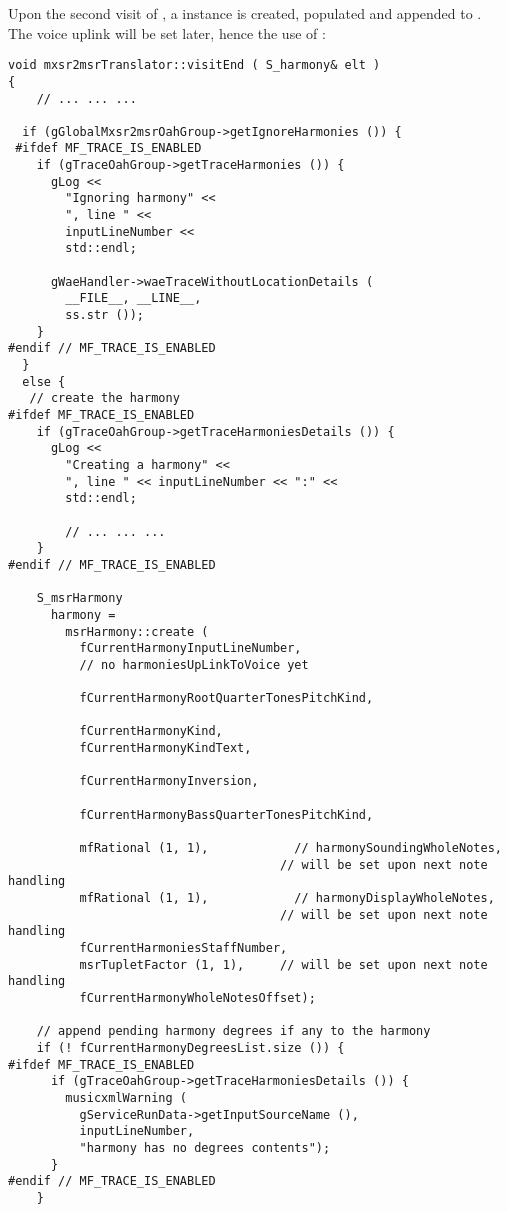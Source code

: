 Upon the second visit of , a  instance is created, populated and appended to .\\
The voice uplink will be set later, hence the use of :
\begin{lstlisting}[language=CPlusPlus]
void mxsr2msrTranslator::visitEnd ( S_harmony& elt )
{
	// ... ... ...

  if (gGlobalMxsr2msrOahGroup->getIgnoreHarmonies ()) {
 #ifdef MF_TRACE_IS_ENABLED
    if (gTraceOahGroup->getTraceHarmonies ()) {
      gLog <<
        "Ignoring harmony" <<
        ", line " <<
        inputLineNumber <<
        std::endl;

      gWaeHandler->waeTraceWithoutLocationDetails (
        __FILE__, __LINE__,
        ss.str ());
    }
#endif // MF_TRACE_IS_ENABLED
  }
  else {
   // create the harmony
#ifdef MF_TRACE_IS_ENABLED
    if (gTraceOahGroup->getTraceHarmoniesDetails ()) {
      gLog <<
        "Creating a harmony" <<
        ", line " << inputLineNumber << ":" <<
        std::endl;

    	// ... ... ...
    }
#endif // MF_TRACE_IS_ENABLED

    S_msrHarmony
      harmony =
        msrHarmony::create (
          fCurrentHarmonyInputLineNumber,
          // no harmoniesUpLinkToVoice yet

          fCurrentHarmonyRootQuarterTonesPitchKind,

          fCurrentHarmonyKind,
          fCurrentHarmonyKindText,

          fCurrentHarmonyInversion,

          fCurrentHarmonyBassQuarterTonesPitchKind,

          mfRational (1, 1),            // harmonySoundingWholeNotes,
                                      // will be set upon next note handling
          mfRational (1, 1),            // harmonyDisplayWholeNotes,
                                      // will be set upon next note handling
          fCurrentHarmoniesStaffNumber,
          msrTupletFactor (1, 1),     // will be set upon next note handling
          fCurrentHarmonyWholeNotesOffset);

    // append pending harmony degrees if any to the harmony
    if (! fCurrentHarmonyDegreesList.size ()) {
#ifdef MF_TRACE_IS_ENABLED
      if (gTraceOahGroup->getTraceHarmoniesDetails ()) {
        musicxmlWarning (
          gServiceRunData->getInputSourceName (),
          inputLineNumber,
          "harmony has no degrees contents");
      }
#endif // MF_TRACE_IS_ENABLED
    }


\end{lstlisting}
